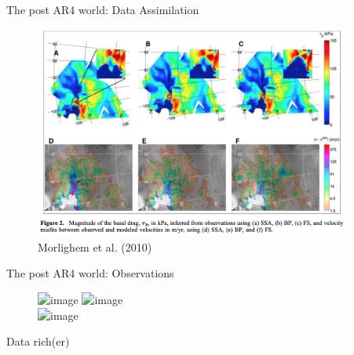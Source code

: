 \documentclass[hide notes,intlimits]{beamer}
\begin{document}
\begin{frame}{The post AR4 world: Data Assimilation}
    \begin{figure}
      \includegraphics[height=7cm]{morlighem_2010_fig_2}
      \\ \tiny{Morlighem et al. (2010)}
    \end{figure}
\end{frame}


\begin{frame}{The post AR4 world: Observations}
  \begin{figure}
    \includegraphics<1>[height=3cm]{grace-satellites} \vspace{0.5em}
    \includegraphics<1>[height=3cm]{sentinel-satellites}
    \\[.5em]
    \includegraphics<1>[height=3cm]{oib}
  \end{figure}
  Data rich(er)
\end{frame}
\end{document}
